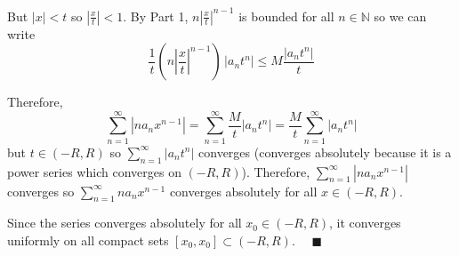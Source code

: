 \documentclass[12pt]{article}
\newcommand{\N}{\mathbb{N}}
\newcommand{\qed}{\quad \blacksquare}
\newcommand{\abs}[1]{\left\vert #1 \right\vert}
\begin{document}
\begin{enumerate}
            But $|x| < t$ so $\abs{\frac{x}{t}} < 1$. By Part 1, $n\abs{\frac{x}{t}}^{n-1}$ is bounded for all $n \in \N$ so we can write 
            \[\frac{1}{t} \left(n\abs{\frac{x}{t}}^{n-1}\right) \, \abs{a_n t^n} \leq M \frac{\abs{a_n t^n}}{t}\]

            Therefore, 
            \[\sum_{n=1}^{\infty} \abs{na_n x^{n-1}} = \sum_{n=1}^{\infty} \frac{M}{t} \abs{a_n t^n} = \frac{M}{t}\sum_{n=1}^{\infty} \abs{a_nt^n}\]
            but $t \in (-R, R)$ so $\sum_{n=1}^{\infty} \abs{a_n t^n}$ converges (converges absolutely because it is a power series which converges on $(-R, R)$). Therefore, $\sum_{n=1}^{\infty} \abs{na_n x^{n-1}}$ converges so $\sum_{n=1}^{\infty} na_n x^{n-1}$ converges absolutely for all $x \in (-R, R)$. 

            Since the series converges absolutely for all $x_0 \in (-R, R)$, it converges uniformly on all compact sets $[x_0, x_0] \subset (-R, R)$. $\qed$        
        \color{black}


\end{enumerate}

\pagebreak
\end{document}
